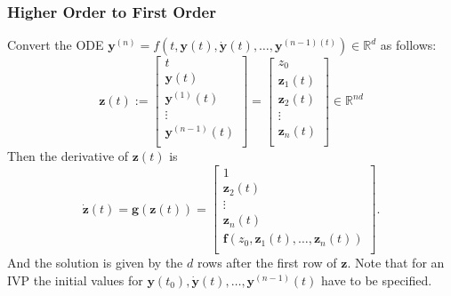 \documentclass[a4paper,11pt]{extarticle}
\newcommand{\R}{\mathbb{R}}
\renewcommand{\vec}[1]{\mathbf{#1}}
\newcommand{\vf}{\vec{f}}
\newcommand{\vg}{\vec{g}}
\newcommand{\vy}{\vec{y}}
\newcommand{\vz}{\vec{z}}
\newcommand*{\svertbar}{\rule[-0.5ex]{0.5pt}{2ex}}
\begin{document}
\begin{multicols*}{2}
\subsubsection{Higher Order to First Order}

Convert the ODE
$\vy^{(n)}=f(t,\vy(t),\dot{\vy}(t),\ldots,\vy^{(n-1)(t)})\in\R^d$ as follows:
\[
\vz(t) :=
\begin{bmatrix}
t\\
\vy(t)\\
\vy^{(1)}(t)\\
\vdots\\
\vy^{(n-1)}(t)\\
\end{bmatrix}
=
\begin{bmatrix}
z_0\\
\vz_1(t)\\
\vz_2(t)\\
\vdots\\
\vz_{n}(t)\\
\end{bmatrix}
\in\R^{nd}
\]
Then the derivative of $\vz(t)$ is
\[
\dot{\vz}(t)
=
\vg(\vz(t))
=
\begin{bmatrix}
1\\
\vz_2(t)\\
\vdots\\
\vz_n(t)\\
\vf(z_0,\vz_1(t),\ldots,\vz_n(t))\\
\end{bmatrix}.
\]
And the solution is given by the $d$ rows after the first row of $\vz$. Note
that for an IVP the initial values for
$\vy(t_0),\dot{\vy}(t),\ldots,\vy^{(n-1)}(t)$ have to be specified.


\end{multicols*}
\end{document}
